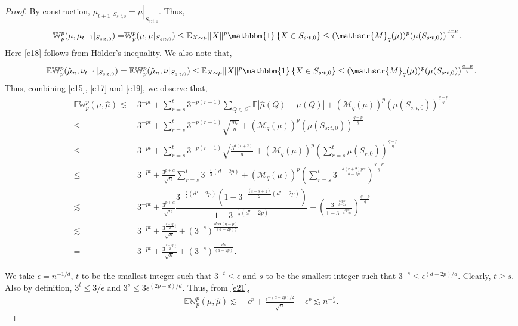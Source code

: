 \documentclass[12pts]{article}
\newcommand{\one}{\mathbbm{1}}
\newcommand{\sM}{ \mathscr{M}}
\newcommand{\sQ}{ \mathscr{Q}}
\newcommand{\hmu}{\hat{\mu}}
\newcommand{\E}{\mathbb{E}}
\newcommand{\fW}{\mathbb{W}}
\begin{document}
\begin{proof}
 By construction, $ \mu_{t+1}|_{S_{s:t,0}}= \mu|_{S_{s:t,0}} $. Thus,
 \begin{align}
     \fW_p^p(\mu, \mu_{t+1}|_{S_{s:t,0}}) = & \fW_p^p(\mu, \mu|_{S_{s:t,0}}) \le \E_{X \sim \mu} \|X\|^p \one\left\{ X \in {S_{s:t,0}} \right\}
     \le  (\sM_q(\mu))^p (\mu(S_{s:t,0}))^{\frac{q-p}{q}} \label{e18}.
 \end{align}
 Here \eqref{e18} follows from H\"older's inequality. We also note that, 
 \begin{align}
    \E  \fW_p^p(\hmu_n, \nu_{t+1}|_{S_{s:t,0}}) =  \E \fW_p^p(\hmu_n, \nu|_{S_{s:t,0}})
    \le  \E_{X \sim \mu} \|X\|^p \one\left\{ X \in {S_{s:t,0}} \right\} 
    \le  (\sM_q(\mu))^p (\mu(S_{s:t,0}))^{\frac{q-p}{q}} \label{e19}.
 \end{align}
 Thus, combining \eqref{e15}, \eqref{e17} and \eqref{e19}, we observe that,
 \begingroup
 \allowdisplaybreaks
 \begin{align}
     \E \fW^p_p(\mu, \hmu) \lesssim & \  3^{-p t} + \sum_{r=s}^t 3^{-p(r-1)} \sum_{Q \in \sQ^{r}} \E |\hmu(Q) - \mu(Q) |   + (\sM_q(\mu))^p (\mu(S_{s:t,0}))^{\frac{q-p}{q}} \nonumber\\
     \le & \ 3^{-p t} + \sum_{r=s}^t 3^{-p(r-1)}  \sqrt{\frac{m_r}{n}}   + (\sM_q(\mu))^p (\mu(S_{s:t,0}))^{\frac{q-p}{q}} \label{e20}\\
     \le & \ 3^{-p t} + \sum_{r=s}^t 3^{-p(r-1)}  \sqrt{\frac{3^{d (r+2)}}{n}}   + (\sM_q(\mu))^p \left(\sum_{r=s}^t\mu(S_{r,0})\right)^{\frac{q-p}{q}} \nonumber\\
     \le & \ 3^{-p t} + \frac{3^{p+d}}{\sqrt{n}}\sum_{r=s}^t 3^{-\frac{r}{2}(d - 2p)}   + (\sM_q(\mu))^p \left(\sum_{r=s}^t 3^{-\frac{d(r+2) p \alpha }{ d - 2 p}}\right)^{\frac{q-p}{q}} \nonumber \\
     \lesssim & \ 3^{-p t} + \frac{3^{p+d}}{\sqrt{n}}\dfrac{3^{-\tfrac{s}{2}(d'-2p)} \left(1 - 3^{-\tfrac{(t-s+1)}{2}(d'-2p)}\right)}{1 - 3^{-\tfrac{1}{2}(d'-2p)}}  + \left( \frac{3^{-\frac{d s p \alpha }{ d - 2 p}}}{ 1 - 3^{-\frac{d p \alpha }{ d - 2 p}}}\right)^{\frac{q-p}{q}} \nonumber\\
     \lesssim & \ 3^{-p t} + \frac{3^{\frac{d - 2 p }{2} t}}{\sqrt{n}} + (3^{-s})^{\frac{d p \alpha (q-p)}{(d - 2 p)q}}  \nonumber\\
     = & \ 3^{-p t} + \frac{3^{\frac{d - 2 p }{2} t}}{\sqrt{n}} + (3^{-s})^{\frac{d p }{(d - 2 p)}}. \label{e21}
 \end{align}
 \endgroup

 We take $\epsilon = n^{-1/d}$, $t$ to be the smallest integer such that $3^{-t} \le \epsilon$ and $s$ to be the smallest integer such that $3^{-s} \le \epsilon^{(d - 2p)/d}$. Clearly, $t \ge s$. Also by definition, $3^t \le 3/\epsilon$ and $3^s \le 3 \epsilon^{(2 p - d)/d}$. Thus, from \eqref{e21},
 \begin{align}
     \E \fW^p_p(\mu, \hmu) \lesssim & \ \epsilon^p + \frac{\epsilon^{-(d - 2p)/2}}{\sqrt{n}} + \epsilon^{p} \lesssim n^{-\frac{p}{d}}.
 \end{align}

 \end{proof}
\end{document}
